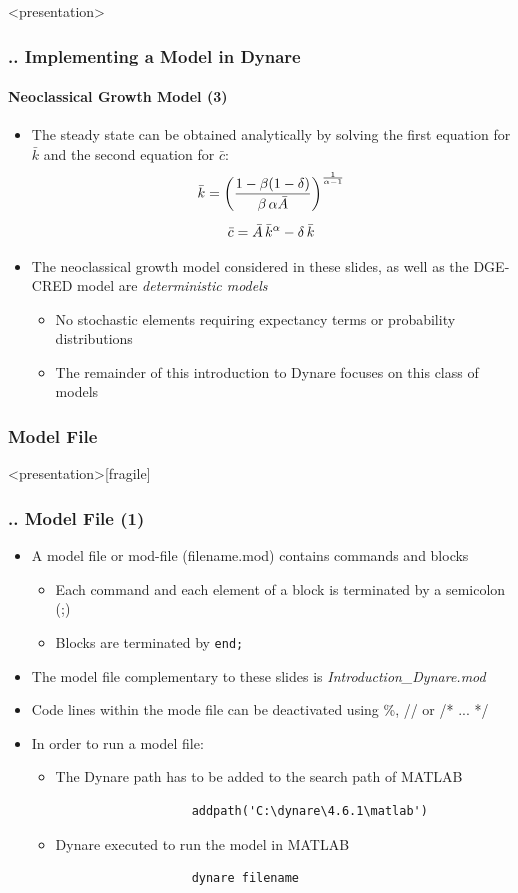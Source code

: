 \documentclass[11pt,aspectratio=169]{beamer}
\begin{document}
\begin{frame}<presentation>
\frametitle{{\thesection.\thesubsection.\thesubsubsection} Implementing a Model in Dynare}
\framesubtitle{Neoclassical Growth Model (3)}
	\begin{itemize}
		\item The steady state can be obtained analytically by solving the first equation for $\bar{k}$ and the second equation for $\bar{c}$:
		\begin{gather*}
		\bar{k} = \bigg(\frac{1-\beta (1-\delta)}{\beta\thinspace\alpha\bar{A}}\bigg)^\frac{1}{\alpha -1}\\[5pt]
		\bar{c} = \bar{A} \thinspace \bar{k}^\alpha - \delta \thinspace \bar{k}		
		\end{gather*}
		\item The neoclassical growth model considered in these slides, as well as the \linebreak DGE-CRED model are \textit{deterministic models}
		\begin{itemize}
			\item No stochastic elements requiring expectancy terms or probability distributions
			\item The remainder of this introduction to Dynare focuses on this class of models
		\end{itemize}  
	\end{itemize}
\end{frame}
\subsubsection{Model File}
\begin{frame}<presentation>[fragile]
	\frametitle{{\thesection.\thesubsection.\thesubsubsection} Model File (1)}
	\begin{itemize}
		\item A model file or mod-file (filename.mod) contains commands and blocks 
		\begin{itemize}
			\item Each command and each element of a block is terminated by a semicolon (;)
			\item Blocks are terminated by \texttt{end;} 
		\end{itemize}
		\item The model file complementary to these slides is \textit{Introduction\_Dynare.mod}
		\item Code lines within the mode file can be deactivated using \%, // or /* ... */
		\item In order to run a model file:
		\begin{itemize}
			\item The Dynare path has to be added to the search path of MATLAB
				\begin{verbatim}
				   addpath('C:\dynare\4.6.1\matlab')
				\end{verbatim}
			\item Dynare executed to run the model in MATLAB
				\begin{verbatim}
				   dynare filename
				\end{verbatim}
		\end{itemize} 
	\end{itemize}
\end{frame}
\end{document}
